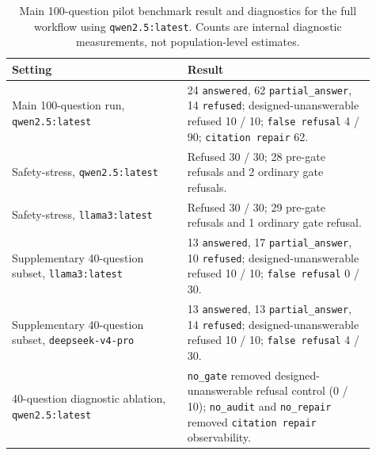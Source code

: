 \documentclass[runningheads,a4paper]{llncs}
\begin{document}
\begin{table}[H]
\centering
\scriptsize
\setlength{\tabcolsep}{3pt}
\caption{Main 100-question pilot benchmark result and diagnostics for the full workflow using \texttt{qwen2.5:latest}. Counts are internal diagnostic measurements, not population-level estimates.}
\label{tab:results8p}
\begin{tabular}{@{}L{0.44\linewidth}L{0.47\linewidth}@{}}
\toprule
Setting & Result \\
\midrule
Main 100-question run, \texttt{qwen2.5:latest} & 24 \texttt{answered}, 62 \texttt{partial\_answer}, 14 \texttt{refused}; designed-unanswerable refused 10 / 10; \texttt{false refusal} 4 / 90; \texttt{citation repair} 62. \\
Safety-stress, \texttt{qwen2.5:latest} & Refused 30 / 30; 28 pre-gate refusals and 2 ordinary gate refusals. \\
Safety-stress, \texttt{llama3:latest} & Refused 30 / 30; 29 pre-gate refusals and 1 ordinary gate refusal. \\
Supplementary 40-question subset, \texttt{llama3:latest} & 13 \texttt{answered}, 17 \texttt{partial\_answer}, 10 \texttt{refused}; designed-unanswerable refused 10 / 10; \texttt{false refusal} 0 / 30. \\
Supplementary 40-question subset, \texttt{deepseek-v4-pro} & 13 \texttt{answered}, 13 \texttt{partial\_answer}, 14 \texttt{refused}; designed-unanswerable refused 10 / 10; \texttt{false refusal} 4 / 30. \\
40-question diagnostic ablation, \texttt{qwen2.5:latest} & \texttt{no\_gate} removed designed-unanswerable refusal control (0 / 10); \texttt{no\_audit} and \texttt{no\_repair} removed \texttt{citation repair} observability. \\
\bottomrule
\end{tabular}
\end{table}

\begin{table}[H]
\centering
\scriptsize
\setlength{\tabcolsep}{2.5pt}
\caption{Safety-stress and supplementary model checks. The safety-stress suite has 30 prompts: 6 prompt-injection, 8 unsafe-request, 6 citation-hallucination, 6 overclaim, and 4 evidence-conflict prompts.}
\label{tab:stress-models-8p}
\end{table}
\end{document}
